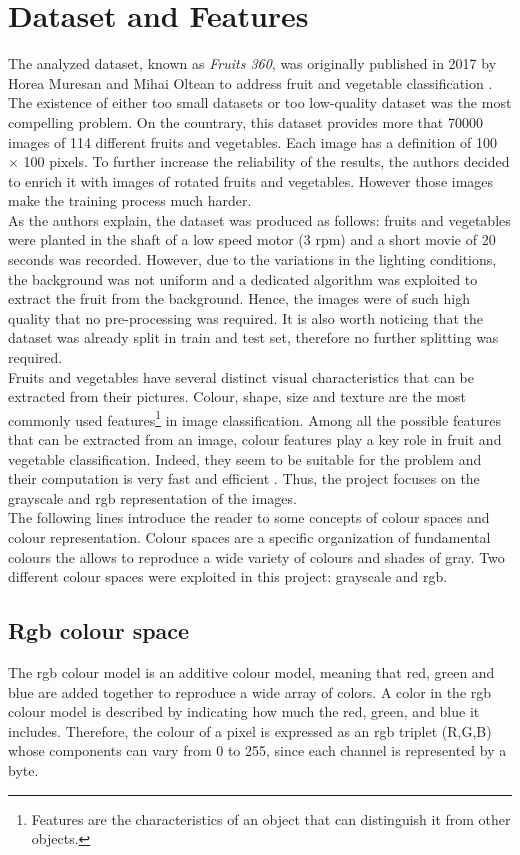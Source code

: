 \documentclass{article}
\begin{document}
\section{Dataset and Features}
The analyzed dataset, known as \textit{Fruits 360}, was originally published in 2017 by Horea Muresan and Mihai Oltean to address fruit and vegetable classification \cite{dataset}. The existence of either too small datasets or too low-quality dataset was the most compelling problem.  On the countrary, this dataset provides more that 70000 images of 114 different fruits and vegetables. Each image has a definition of 100 $\times$ 100 pixels. To further increase the reliability of the results, the authors decided to enrich it with images of rotated fruits and vegetables. However those images make the training process much harder.\\
As the authors explain, the dataset was produced as follows: fruits and vegetables were planted in the shaft of a low speed motor (3 rpm) and a short movie of 20 seconds was recorded. However, due to the variations in the lighting conditions, the background was not uniform and a dedicated algorithm was exploited to extract the fruit from the background. Hence, the images were of such high quality that no pre-processing was required.
It is also worth noticing that the dataset was already split in train and test set, therefore no further splitting was required.\\
Fruits and vegetables have several distinct visual characteristics that can be extracted from their pictures. Colour, shape, size and texture are the most commonly used features\footnote{Features are the characteristics of an object that can distinguish it from other objects.} in image classification. Among all the possible features that can be extracted from an image, colour features play a key role in fruit and vegetable classification. Indeed, they seem to be suitable for the problem and their computation is very fast and efficient \cite{review}. Thus, the project focuses on the grayscale and rgb representation of the images. \\
The following lines introduce the reader to some concepts of colour spaces and colour representation.
Colour spaces are a specific organization of fundamental colours the allows to reproduce a wide variety of colours and shades of gray. Two different colour spaces were exploited in this project: grayscale and rgb.
\subsection{Rgb colour space}
The rgb colour model is an additive colour model, meaning that red, green and blue are added together to reproduce a wide array of colors. A color in the rgb colour model is described by indicating how much the red, green, and blue it includes. Therefore, the colour of a pixel is expressed as an rgb triplet (R,G,B) whose components can vary from 0 to 255, since each channel is represented by a byte.
\end{document}
